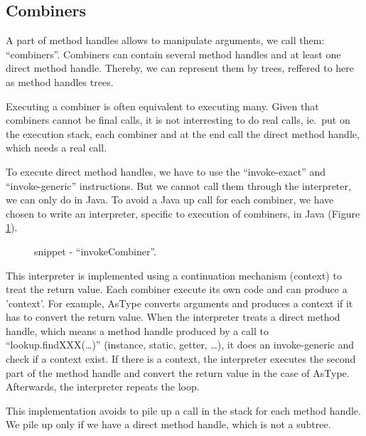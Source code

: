 \documentclass{sig-alternate}
\begin{document}
    \subsection{Combiners}
    \label{combiners}

      A part of method handles allows to manipulate arguments, we call them: ``combiners''.
      Combiners can contain several method handles and at least one direct method handle.
      Thereby, we can represent them by trees, reffered to here as method handles trees.

      Executing a combiner is often equivalent to executing many.
      Given that combiners cannot be final calls,
      it is not interresting to do real calls, ie.~put on the execution stack,
      each combiner and at the end call the direct method handle, which needs a real call.

      To execute direct method handles, we have to use the ``invoke-exact'' and ``invoke-generic'' instructions.
      But we cannot call them through the interpreter, we can only do in Java.
      To avoid a Java up call for each combiner, we have chosen to write an interpreter,
      specific to execution of combiners, in Java (Figure \ref{implINTERP}).

      \begin{figure}[!h]
        \centering \vspace{-1.5em}
        \caption{snippet - ``invokeCombiner''.}
        \label{implINTERP}
      \end{figure}

      This interpreter is implemented using a continuation mechanism (context) to treat the return value.
      Each combiner execute its own code and can produce a 'context'.
      For example, AsType converts arguments and produces a context if it has to convert the return value.
      When the interpreter treats a direct method handle,
      which means a method handle produced by a call to ``lookup.findXXX(\dots)'' (instance, static, getter, \dots),
      it does an invoke-generic and check if a context exist.
      If there is a context, the interpreter executes the second part of the method handle
      and convert the return value in the case of AsType.
      Afterwards, the interpreter repeats the loop.

      This implementation avoids to pile up a call in the stack for each method handle.
      We pile up only if we have a direct method handle, which is not a subtree.
\end{document}

